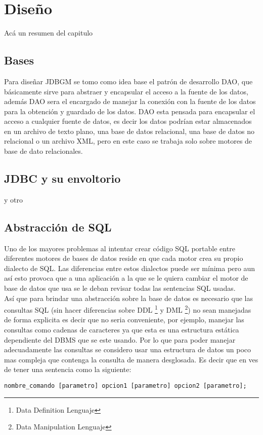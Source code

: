\chapter{Diseño}
Acá un resumen del capitulo
\section{Bases}
Para diseñar JDBGM se tomo como idea base el patrón de desarrollo DAO, que básicamente sirve para abstraer y encapsular el acceso a la fuente de los datos, además DAO sera el encargado de manejar la conexión con la fuente de los datos para la obtención y guardado de los datos.
DAO esta pensada para encapsular el acceso a cualquier fuente de datos, es decir los datos podrían estar almacenados en un archivo de texto plano, una base de datos relacional, una base de datos no relacional o un archivo XML, pero en este caso se trabaja solo sobre motores de base de dato relacionales.  
\section{JDBC y su envoltorio}
y otro
\section{Abstracción de SQL}
Uno de los mayores problemas al intentar crear código SQL portable entre diferentes motores de bases de datos reside en que cada motor crea su propio dialecto de SQL. Las diferencias entre estos dialectos puede ser mínima pero aun así esto provoca que a una aplicación a la que se le quiera cambiar el motor de base de datos que usa se le deban revisar todas las sentencias SQL usadas.\\
Así que para brindar una abstracción sobre la base de datos es necesario que las consultas SQL (sin hacer diferencias sobre DDL \footnote{Data Definition Lenguaje} y DML \footnote{Data Manipulation Lenguaje}) no sean manejadas de forma explicita es decir que no seria conveniente, por ejemplo, manejar las consultas como cadenas de caracteres ya que esta es una estructura estática dependiente del DBMS que se este usando. Por lo que para poder manejar adecuadamente las consultas se considero usar una estructura de datos un poco mas compleja que contenga la consulta de manera desglosada. Es decir que en ves de tener una sentencia como la siguiente:
\begin{verbatim}
nombre_comando [parametro] opcion1 [parametro] opcion2 [parametro]; 
\end{verbatim}

